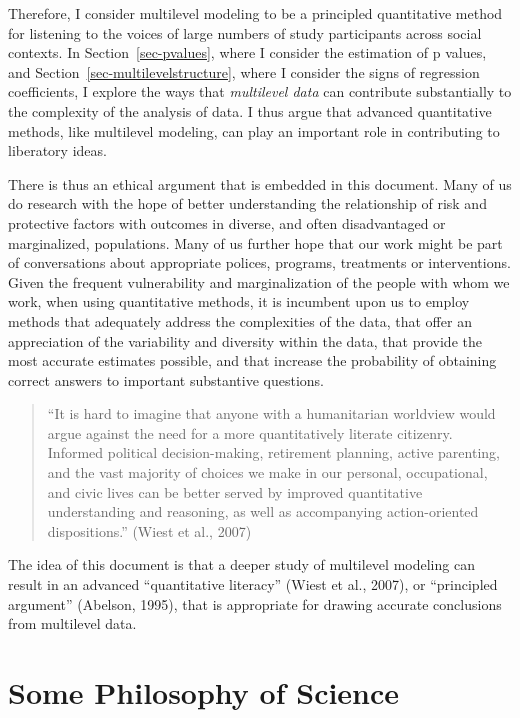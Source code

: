 \documentclass[
  letterpaper,
  DIV=11,
  numbers=noendperiod]{scrreprt}
\begin{document}
Therefore, I consider multilevel modeling to be a principled
quantitative method for listening to the voices of large numbers of
study participants across social contexts. In Section~\ref{sec-pvalues},
where I consider the estimation of p values, and
Section~\ref{sec-multilevelstructure}, where I consider the signs of
regression coefficients, I explore the ways that \emph{multilevel data}
can contribute substantially to the complexity of the analysis of data.
I thus argue that advanced quantitative methods, like multilevel
modeling, can play an important role in contributing to liberatory
ideas.

There is thus an ethical argument that is embedded in this document.
Many of us do research with the hope of better understanding the
relationship of risk and protective factors with outcomes in diverse,
and often disadvantaged or marginalized, populations. Many of us further
hope that our work might be part of conversations about appropriate
polices, programs, treatments or interventions. Given the frequent
vulnerability and marginalization of the people with whom we work, when
using quantitative methods, it is incumbent upon us to employ methods
that adequately address the complexities of the data, that offer an
appreciation of the variability and diversity within the data, that
provide the most accurate estimates possible, and that increase the
probability of obtaining correct answers to important substantive
questions.

\begin{quote}
``It is hard to imagine that anyone with a humanitarian worldview would
argue against the need for a more quantitatively literate citizenry.
Informed political decision-making, retirement planning, active
parenting, and the vast majority of choices we make in our personal,
occupational, and civic lives can be better served by improved
quantitative understanding and reasoning, as well as accompanying
action-oriented dispositions.'' (Wiest et al., 2007)
\end{quote}

The idea of this document is that a deeper study of multilevel modeling
can result in an advanced ``quantitative literacy'' (Wiest et al.,
2007), or ``principled argument'' (Abelson, 1995), that is appropriate
for drawing accurate conclusions from multilevel data.

\section{Some Philosophy of Science}\label{some-philosophy-of-science}
\end{document}
